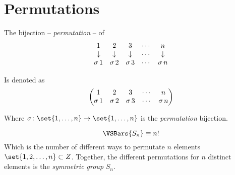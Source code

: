 \section{Permutations}
\begin{definition}[Permutation]
    The bijection -- \textit{permutation} -- of
    \begin{equation}
        \begin{matrix}
            1 &2 &3 &\cdots &n \\
            \downarrow &\downarrow &\downarrow &\cdots &\downarrow \\
            \operatorname{\sigma}{1} &\operatorname{\sigma}{2} &\operatorname{\sigma}{3} &\cdots &\operatorname{\sigma}{n}
        \end{matrix}
    \end{equation}
    
    Is denoted as
    \begin{equation}
        \begin{pmatrix}
            1 &2 &3 &\cdots &n \\
            \operatorname{\sigma}{1} &\operatorname{\sigma}{2} &\operatorname{\sigma}{3} &\cdots &\operatorname{\sigma}{n}
        \end{pmatrix}
    \end{equation}
    
    Where $\sigma \colon \set{1, \dots, n} \to \set{1, \dots, n}$ is the \textit{permutation} bijection.
\end{definition}

\begin{definition}
    \begin{equation}
        \VSBars{S_n} \equiv n!
    \end{equation}
    Which is the number of different ways to permutate $n$ elements $\set{1, 2, \dots, n} \subset \Int$. Together, the different permutations for $n$ distinct elements is the \textit{symmetric group} $S_n$.
\end{definition}

